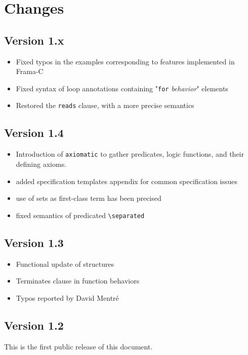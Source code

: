 \documentclass[a4paper,11pt,twoside,openright]{report}
\begin{document}
\section{Changes}

\subsection{Version 1.x}
\begin{itemize}
\item Fixed typos in the examples corresponding to features
  implemented in Frama-C
\item Fixed syntax of loop annotations containing "\texttt{for}
  \textsl{behavior}" elements
\item Restored the \texttt{reads} clause, with a more precise semantics
\end{itemize}

\subsection{Version 1.4}
\begin{itemize}
\item Introduction of \verb|axiomatic| to gather predicates, logic
  functions, and their defining axioms.
\item added specification templates appendix for common specification issues
\item use of sets as first-class term has been precised
\item fixed semantics of predicated \verb|\separated|
\end{itemize}

\subsection{Version 1.3}
\begin{itemize}
\item Functional update of structures
\item Terminates clause in function behaviors
\item Typos reported by David Mentr\'e

\end{itemize}

\subsection{Version 1.2}
This is the first public release of this document.

\cleardoublepage
{}

%


\cleardoublepage
{}
\listoffigures

\cleardoublepage
{}
\printindex
\end{document}
